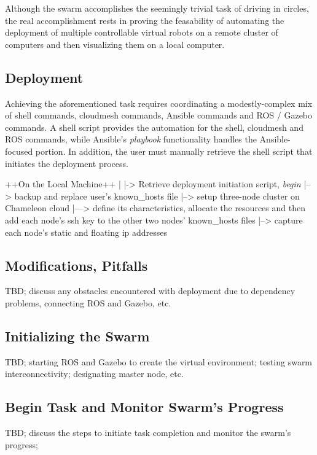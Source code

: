\documentclass[9pt,twocolumn,twoside]{../../styles/osajnl}
\begin{document}
Although the swarm accomplishes the seemingly trivial task of driving in circles, the real accomplishment rests in proving the feasability of automating the deployment of multiple controllable virtual robots on a remote cluster of computers and then visualizing them on a local computer.

\subsection{Deployment}
Achieving the aforementioned task requires coordinating a modestly-complex mix of shell commands, cloudmesh commands, Ansible commands and ROS / Gazebo commands. A shell script provides the automation for the shell, cloudmesh and ROS commands, while Ansible's \textit{playbook} functionality handles the Ansible-focused portion.  In addition, the user must manually retrieve the shell script that initiates the deployment process.  

++On the Local Machine++ \newline
| \newline
|-> Retrieve deployment initiation script, \textit{begin} \newline
|--> backup and replace user's known\_hosts file \newline
|--> setup three-node cluster on Chameleon cloud \newline
|---> define its characteristics, allocate the resources and then add each node's ssh key to the other two nodes' known\_hosts files \newline
|--> capture each node's static and floating ip addresses \newline


\subsection{Modifications, Pitfalls}
TBD; discuss any obstacles encountered with deployment due to dependency problems, connecting ROS and Gazebo, etc.
\subsection{Initializing the Swarm}
TBD; starting ROS and Gazebo to create the virtual environment; testing swarm interconnectivity; designating master node, etc.
\subsection{Begin Task and Monitor Swarm's Progress}
TBD; discuss the steps to initiate task completion and monitor the swarm's progress;
\end{document}
